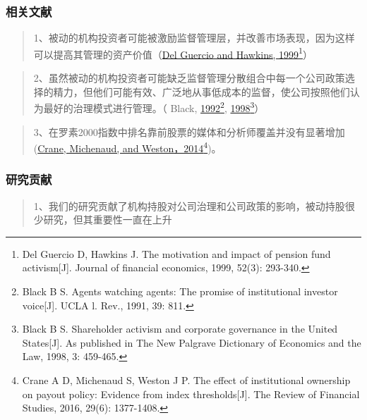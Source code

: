 \documentclass[
]{article}
\begin{document}
\hypertarget{ux76f8ux5173ux6587ux732e-2}{%
\subsubsection{相关文献}\label{ux76f8ux5173ux6587ux732e-2}}

\begin{quote}
1、被动的机构投资者可能被激励监督管理层，并改善市场表现，因为这样可以提高其管理的资产价值（\href{https://doi.org/10.1016/S0304-405X(99)00011-2}{Del
Guercio and Hawkins, 1999}\footnote{Del Guercio D, Hawkins J. The
  motivation and impact of pension fund activism{[}J{]}. Journal of
  financial economics, 1999, 52(3): 293-340.}）
\end{quote}

\begin{quote}
2、虽然被动的机构投资者可能缺乏监督管理分散组合中每一个公司政策选择的精力，但他们可能有效、广泛地从事低成本的监督，使公司按照他们认为最好的治理模式进行管理。（
Black,
\href{https://heinonline.org/HOL/LandingPage?handle=hein.journals/uclalr39\&div=30\&id=\&page=}{1992}\footnote{Black
  B S. Agents watching agents: The promise of institutional investor
  voice{[}J{]}. UCLA l. Rev., 1991, 39: 811.},
\href{https://dx.doi.org/10.2139/ssrn.45100}{1998}\footnote{Black B S.
  Shareholder activism and corporate governance in the United
  States{[}J{]}. As published in The New Palgrave Dictionary of
  Economics and the Law, 1998, 3: 459-465.}）
\end{quote}

\begin{quote}
3、在罗素2000指数中排名靠前股票的媒体和分析师覆盖并没有显著增加
(\href{https://doi.org/10.1093/rfs/hhw012}{Crane, Michenaud, and
Weston，2014}\footnote{Crane A D, Michenaud S, Weston J P. The effect of
  institutional ownership on payout policy: Evidence from index
  thresholds{[}J{]}. The Review of Financial Studies, 2016, 29(6):
  1377-1408.})。
\end{quote}

\hypertarget{ux7814ux7a76ux8d21ux732e}{%
\subsubsection{研究贡献}\label{ux7814ux7a76ux8d21ux732e}}

\begin{quote}
1、我们的研究贡献了机构持股对公司治理和公司政策的影响，被动持股很少研究，但其重要性一直在上升
\end{quote}
\end{document}
